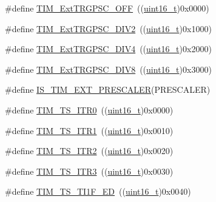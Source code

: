 \begin{DoxyCompactItemize}
\item 
\#define \hyperlink{group___t_i_m___external___trigger___prescaler_ga1b21757d5d1b708edca7e20481797e96}{T\+I\+M\+\_\+\+Ext\+T\+R\+G\+P\+S\+C\+\_\+\+O\+FF}~((\hyperlink{_p_e___types_8h_a1f1825b69244eb3ad2c7165ddc99c956}{uint16\+\_\+t})0x0000)
\item 
\#define \hyperlink{group___t_i_m___external___trigger___prescaler_ga446ed7f1bc28bcb295c43886da582e47}{T\+I\+M\+\_\+\+Ext\+T\+R\+G\+P\+S\+C\+\_\+\+D\+I\+V2}~((\hyperlink{_p_e___types_8h_a1f1825b69244eb3ad2c7165ddc99c956}{uint16\+\_\+t})0x1000)
\item 
\#define \hyperlink{group___t_i_m___external___trigger___prescaler_ga1de0031af7654fac2f29705f1da146c6}{T\+I\+M\+\_\+\+Ext\+T\+R\+G\+P\+S\+C\+\_\+\+D\+I\+V4}~((\hyperlink{_p_e___types_8h_a1f1825b69244eb3ad2c7165ddc99c956}{uint16\+\_\+t})0x2000)
\item 
\#define \hyperlink{group___t_i_m___external___trigger___prescaler_gac2fe5014d69a93ce0a22b9f3f5a7d19a}{T\+I\+M\+\_\+\+Ext\+T\+R\+G\+P\+S\+C\+\_\+\+D\+I\+V8}~((\hyperlink{_p_e___types_8h_a1f1825b69244eb3ad2c7165ddc99c956}{uint16\+\_\+t})0x3000)
\item 
\#define \hyperlink{group___t_i_m___external___trigger___prescaler_ga615587e6aae397d9fe8166004e7324f2}{I\+S\+\_\+\+T\+I\+M\+\_\+\+E\+X\+T\+\_\+\+P\+R\+E\+S\+C\+A\+L\+ER}(P\+R\+E\+S\+C\+A\+L\+ER)
\item 
\#define \hyperlink{group___t_i_m___internal___trigger___selection_gab7cf2b7db3956d4fd1e5a5d84f4891e7}{T\+I\+M\+\_\+\+T\+S\+\_\+\+I\+T\+R0}~((\hyperlink{_p_e___types_8h_a1f1825b69244eb3ad2c7165ddc99c956}{uint16\+\_\+t})0x0000)
\item 
\#define \hyperlink{group___t_i_m___internal___trigger___selection_gad90fbca297153ca9c0112a67ea2c6cb3}{T\+I\+M\+\_\+\+T\+S\+\_\+\+I\+T\+R1}~((\hyperlink{_p_e___types_8h_a1f1825b69244eb3ad2c7165ddc99c956}{uint16\+\_\+t})0x0010)
\item 
\#define \hyperlink{group___t_i_m___internal___trigger___selection_ga8599ba58a5f911d648503c7ac55d4320}{T\+I\+M\+\_\+\+T\+S\+\_\+\+I\+T\+R2}~((\hyperlink{_p_e___types_8h_a1f1825b69244eb3ad2c7165ddc99c956}{uint16\+\_\+t})0x0020)
\item 
\#define \hyperlink{group___t_i_m___internal___trigger___selection_ga63183e611b91c5847040172c0069514d}{T\+I\+M\+\_\+\+T\+S\+\_\+\+I\+T\+R3}~((\hyperlink{_p_e___types_8h_a1f1825b69244eb3ad2c7165ddc99c956}{uint16\+\_\+t})0x0030)
\item 
\#define \hyperlink{group___t_i_m___internal___trigger___selection_ga8c89554efc693e679c94b5a749af123c}{T\+I\+M\+\_\+\+T\+S\+\_\+\+T\+I1\+F\+\_\+\+ED}~((\hyperlink{_p_e___types_8h_a1f1825b69244eb3ad2c7165ddc99c956}{uint16\+\_\+t})0x0040)

\end{DoxyCompactItemize}
